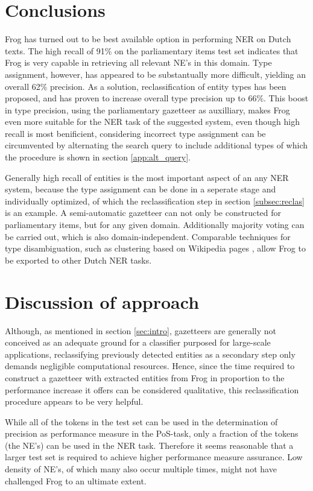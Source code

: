 \section{Conclusions}
\label{sec:conc}
Frog has turned out to be best available option in performing NER on Dutch texts.
The high recall of 91\% on the parliamentary items test set indicates that Frog is very capable in retrieving all relevant NE's in this domain. Type assignment, however, has appeared to be substantually more difficult, yielding an overall 62\% precision. As a solution, reclassification of entity types has been proposed, and has proven to  increase overall type precision up to 66\%. This boost in type precision, using the parliamentary gazetteer as auxilliary, makes Frog even more suitable for the NER task of the suggested system, even though high recall is most benificient, considering incorrect type assignment can be circumvented by alternating the search query to include additional types of which the procedure is shown in section \ref{app:alt_query}. 

Generally high recall of entities is the most important aspect of an any NER system, because the type assignment can be done in a seperate stage and individually optimized, of which the reclassification step in section \ref{subsec:reclas} is an example.  
A semi-automatic gazetteer can not only be constructed for parliamentary items, but for any given domain. Additionally majority voting can be carried out, which is also domain-independent. Comparable techniques for type disambiguation, such as clustering based on Wikipedia pages \cite{cucerzan2007large},  allow Frog to be exported to other Dutch NER tasks.

\section{Discussion of approach}
\label{sec:disc}
Although, as mentioned in section \ref{sec:intro}, gazetteers are generally not conceived as an adequate ground for a classifier purposed for large-scale applications, reclassifying previously detected entities as a secondary step only demands negligible computational resources. Hence, since the time required to construct a gazetteer with extracted entities from Frog in proportion to the performance increase it offers can be considered qualitative, this reclassification procedure appears to be very helpful.

While all of the tokens in the test set can be used in the determination of precision as performance measure in the PoS-task, only a fraction of the tokens (the NE's) can be used in the NER task. Therefore it seems reasonable that a larger test set is required to achieve higher performance measure assurance. Low density of NE's, of which many also occur multiple times, might not have challenged Frog to an ultimate extent. 

